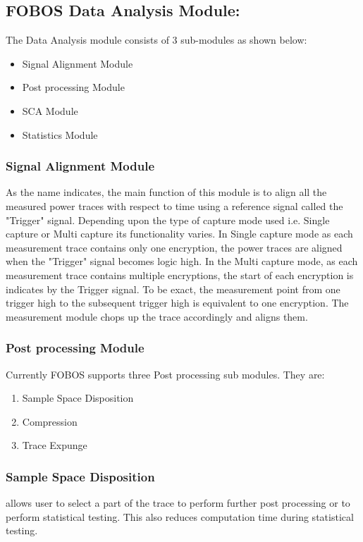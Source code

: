 \documentclass{llncs}
\numberwithin{algorithm}{chapter}
\begin{document}
\subsection{FOBOS Data Analysis Module:}
The Data Analysis module consists of 3 sub-modules as shown below:
\begin{itemize}
\item Signal Alignment Module
\item Post processing Module
\item SCA Module
\item Statistics Module
\end{itemize}

\subsubsection{Signal Alignment Module}
As the name indicates, the main function of this module is to align all the measured power traces
with respect to time using a reference signal called the "Trigger" signal. Depending upon the type
of capture mode used i.e. Single capture or Multi capture its functionality varies. In Single capture
mode as each measurement trace contains only one encryption, the power traces are aligned when the 
"Trigger" signal becomes logic high. In the Multi capture mode, as each measurement trace contains 
multiple encryptions, the start of each encryption is indicates by the Trigger signal.
To be exact, the measurement point from one trigger high to the subsequent trigger high is equivalent
to one encryption. The measurement module chops up the trace accordingly and aligns them.

\subsubsection{Post processing Module}
Currently FOBOS supports three Post processing sub modules. They are:
\begin{enumerate}
\item Sample Space Disposition
\item Compression
\item Trace Expunge
\end{enumerate}

\subsubsection{Sample Space Disposition} allows user to select a part of the trace to perform further post processing
or to perform statistical testing. This also reduces computation time during statistical testing.
\end{document}
